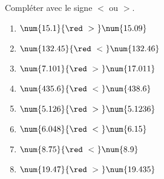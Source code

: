     Compléter avec le signe $<$ ou $>$. \medskip

    \begin{multicols}{2}
        \begin{enumerate}
            \item $\num{15.1  } {\red~>~} \num{15.09 }$
            \item $\num{132.45} {\red~<~} \num{132.46}$
            \item $\num{7.101 } {\red~>~} \num{17.011}$
            \item $\num{435.6 } {\red~<~} \num{438.6 }$
            \item $\num{5.126 } {\red~>~} \num{5.1236}$
            \item $\num{6.048 } {\red~<~} \num{6.15  }$
            \item $\num{8.75  } {\red~<~} \num{8.9   }$
            \item $\num{19.47 } {\red~>~} \num{19.435}$
        \end{enumerate}
    \end{multicols}

